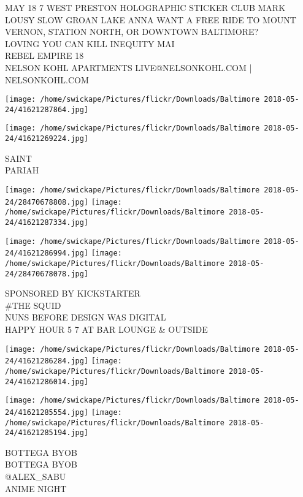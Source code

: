 \documentclass[10pt,letterpaper]{article}
\begin{document}
MAY 18 7 WEST PRESTON HOLOGRAPHIC STICKER CLUB MARK LOUSY SLOW GROAN LAKE ANNA WANT A FREE RIDE TO MOUNT VERNON, STATION NORTH, OR DOWNTOWN BALTIMORE?\\
LOVING YOU CAN KILL INEQUITY MAI\\
REBEL EMPIRE 18\\
NELSON KOHL APARTMENTS LIVE@NELSONKOHL.COM | NELSONKOHL.COM\\
\pagebreak

\texttt{[image: /home/swickape/Pictures/flickr/Downloads/Baltimore 2018-05-24/41621287864.jpg]}

\vspace{0.25in}
\texttt{[image: /home/swickape/Pictures/flickr/Downloads/Baltimore 2018-05-24/41621269224.jpg]}

SAINT\\
PARIAH\\
\pagebreak

\texttt{[image: /home/swickape/Pictures/flickr/Downloads/Baltimore 2018-05-24/28470678808.jpg]}
\texttt{[image: /home/swickape/Pictures/flickr/Downloads/Baltimore 2018-05-24/41621287334.jpg]}

\texttt{[image: /home/swickape/Pictures/flickr/Downloads/Baltimore 2018-05-24/41621286994.jpg]}
\texttt{[image: /home/swickape/Pictures/flickr/Downloads/Baltimore 2018-05-24/28470678078.jpg]}

SPONSORED BY KICKSTARTER\\
\#THE SQUID\\
NUNS BEFORE DESIGN WAS DIGITAL\\
HAPPY HOUR 5 7 AT BAR LOUNGE \& OUTSIDE\\
\pagebreak

\texttt{[image: /home/swickape/Pictures/flickr/Downloads/Baltimore 2018-05-24/41621286284.jpg]}
\texttt{[image: /home/swickape/Pictures/flickr/Downloads/Baltimore 2018-05-24/41621286014.jpg]}

\texttt{[image: /home/swickape/Pictures/flickr/Downloads/Baltimore 2018-05-24/41621285554.jpg]}
\texttt{[image: /home/swickape/Pictures/flickr/Downloads/Baltimore 2018-05-24/41621285194.jpg]}

BOTTEGA BYOB\\
BOTTEGA BYOB\\
@ALEX\_SABU\\
ANIME NIGHT\\
\pagebreak
\end{document}

